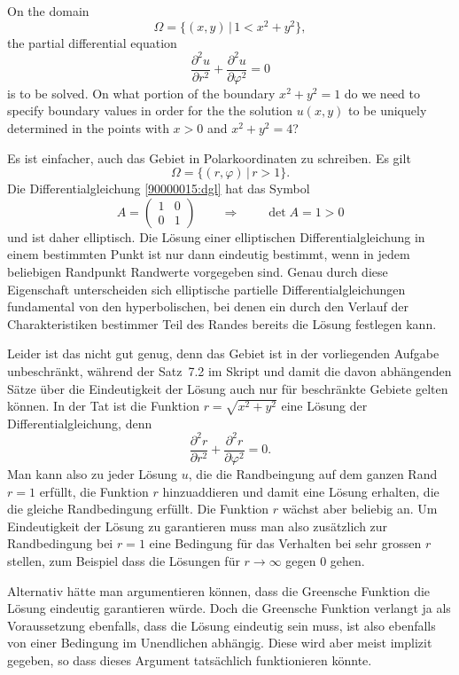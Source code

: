On the domain
\[
\Omega = \{ (x,y)\,|\, 1 < x^2 + y^2\},
\]
the partial differential equation
\begin{equation}
\frac{\partial^2 u}{\partial r^2}
+
\frac{\partial^2 u}{\partial \varphi^2}
=
0
\label{90000015:dgl}
\end{equation}
is to be solved.
On what portion of the boundary
$x^2 +y^2 = 1$
do we need to specify boundary values in order for the the solution $u(x,y)$
to be uniquely determined in the points with $x>0$ and $x^2 + y^2 = 4$?

\begin{loesung}
Es ist einfacher, auch das Gebiet in Polarkoordinaten zu schreiben.
Es gilt
\[
\Omega = \{ (r,\varphi)\,|\, r>1\}.
\]
Die Differentialgleichung \eqref{90000015:dgl} hat das Symbol
\[
A
=
\begin{pmatrix}
1&0\\
0&1
\end{pmatrix}
\qquad\Rightarrow\qquad
\det A=1>0
\]
und ist daher elliptisch.
Die Lösung einer elliptischen Differentialgleichung in einem bestimmten
Punkt ist nur dann eindeutig bestimmt, wenn in jedem beliebigen Randpunkt
Randwerte vorgegeben sind.
Genau durch diese Eigenschaft unterscheiden sich elliptische
partielle Differentialgleichungen fundamental von den
hyperbolischen, bei denen ein durch
den Verlauf der Charakteristiken bestimmer Teil des Randes bereits die
Lösung festlegen kann.

Leider ist das nicht gut genug, denn das Gebiet ist in der vorliegenden
Aufgabe unbeschränkt, während der Satz~7.2 im Skript und damit die davon
abhängenden Sätze über die Eindeutigkeit der Lösung auch nur für beschränkte
Gebiete gelten können.
In der Tat ist die Funktion  $r=\sqrt{x^2+y^2}$ eine Lösung der
Differentialgleichung, denn
\[
\frac{\partial^2 r}{\partial r^2} + \frac{\partial^2 r}{\partial \varphi^2}=0.
\]
Man kann also zu jeder Lösung $u$, die die Randbeingung auf dem ganzen Rand
$r=1$ erfüllt, die Funktion $r$ hinzuaddieren und damit eine Lösung erhalten,
die die gleiche Randbedingung erfüllt.
Die Funktion $r$ wächst aber beliebig an.
Um Eindeutigkeit der Lösung zu garantieren muss man also zusätzlich zur
Randbedingung bei $r=1$ eine Bedingung für das Verhalten bei sehr grossen $r$
stellen, zum Beispiel dass die Lösungen für $r\to\infty$ gegen $0$ gehen.

Alternativ hätte man argumentieren können, dass die Greensche Funktion 
die Lösung eindeutig garantieren würde.
Doch die Greensche Funktion verlangt ja als Voraussetzung ebenfalls,
dass die Lösung eindeutig sein muss, ist also ebenfalls von einer
Bedingung im Unendlichen abhängig.
Diese wird aber meist implizit gegeben, so dass dieses Argument
tatsächlich funktionieren könnte.


\end{loesung}
